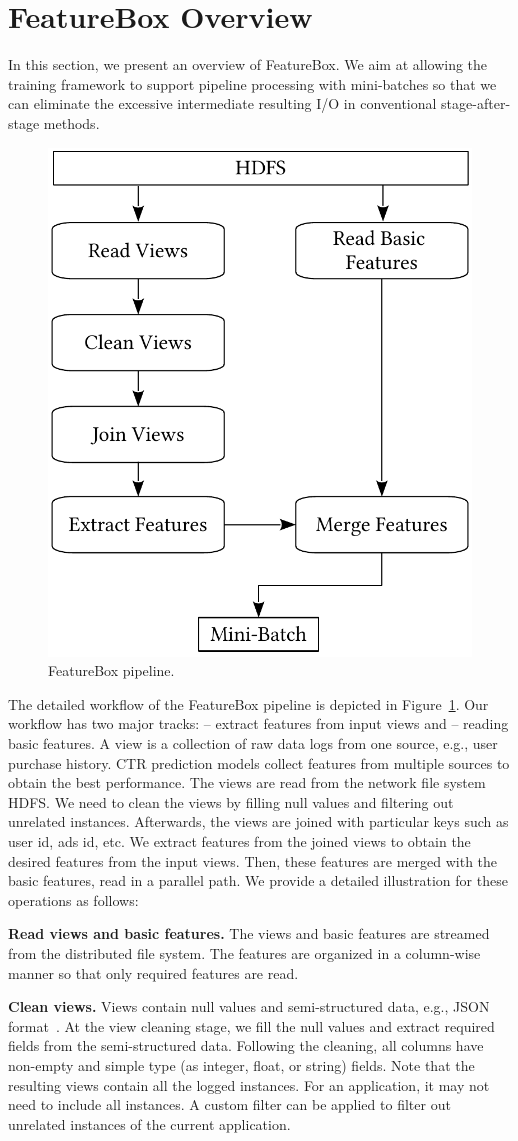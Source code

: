 \documentclass[sigconf]{acmart}
\begin{document}
\section{FeatureBox Overview}
In this section, we present an overview of FeatureBox. We aim at allowing the training framework to support pipeline processing with mini-batches so that we can eliminate the excessive intermediate resulting I/O in conventional stage-after-stage methods.

\begin{figure}[htbp]
\centering
\includegraphics[width=.3\textwidth]{figs/pipeline}
\caption{FeatureBox pipeline.}\label{fig:pipeline}
\end{figure}

The detailed workflow of the FeatureBox pipeline is depicted in Figure~\ref{fig:pipeline}. 
Our workflow has two major tracks: -- extract features from input views and -- reading basic features. 
A view is a collection of raw data logs from one source, e.g., user purchase history. CTR prediction models collect features from multiple sources to obtain the best performance. The views are read from the network file system HDFS. We need to clean the views by filling null values and filtering out unrelated instances. Afterwards, the views are joined with particular keys such as user id, ads id, etc. We extract features from the joined views to obtain the desired features from the input views. Then, these features are merged with the basic features, read in a parallel path. We provide a detailed illustration for these operations as follows:

\textbf{Read views and basic features.}
The views and basic features are streamed from the distributed file system. The features are organized in a column-wise manner so that only required features are read. 

\textbf{Clean views.} 
Views contain null values and semi-structured data, e.g., JSON format~\cite{DBLP:conf/www/PezoaRSUV16}. 
At the view cleaning stage, we fill the null values and extract required fields from the semi-structured data. 
Following the cleaning, all columns have non-empty and simple type (as integer, float, or string) fields. Note that the resulting views contain all the logged instances. For an application, it may not need to include all instances.%
A custom filter can be applied to filter out unrelated instances of the current application.
\end{document}
